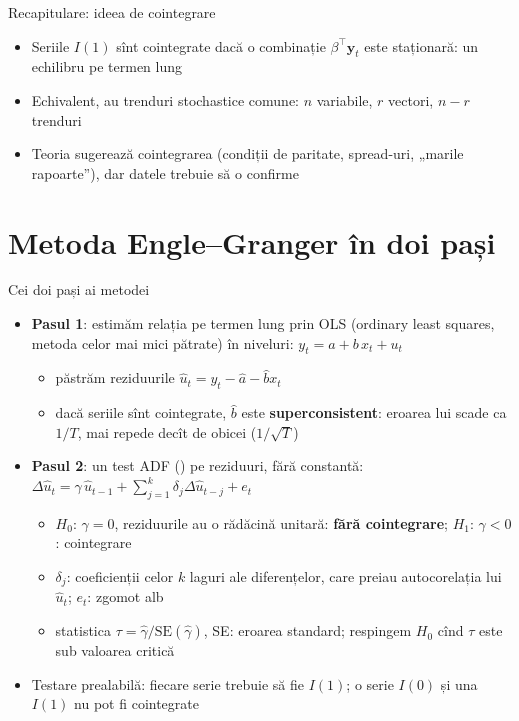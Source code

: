 \begin{frame}{Recapitulare: ideea de cointegrare}
\itemsize{\small}
\begin{itemize}
    \item Seriile $I(1)$ sînt cointegrate dacă o combinație $\beta^\top \mathbf y_t$ este staționară: un echilibru pe termen lung
    \item Echivalent, au trenduri stochastice comune: $n$ variabile, $r$ vectori, $n - r$ trenduri
    \item Teoria sugerează cointegrarea (condiții de paritate, spread-uri, „marile rapoarte”), dar datele trebuie să o confirme
\end{itemize}
\end{frame}


\section{Metoda Engle--Granger în doi pași}

\begin{frame}{Cei doi pași ai metodei}
\itemsize{\small}
\begin{itemize}
    \item \textbf{Pasul 1}: estimăm relația pe termen lung prin OLS (ordinary least squares, metoda celor mai mici pătrate) în niveluri: $y_t = a + b\,x_t + u_t$
    \begin{itemize}
        \item păstrăm reziduurile $\hat u_t = y_t - \hat a - \hat b x_t$
        \item dacă seriile sînt cointegrate, $\hat b$ este \textbf{superconsistent}: eroarea lui scade ca $1/T$, mai repede decît de obicei ($1/\sqrt{T}$)
    \end{itemize}
    \item \textbf{Pasul 2}: un test ADF () pe reziduuri, fără constantă: $\Delta\hat u_t = \gamma\,\hat u_{t-1} + \sum_{j=1}^{k}\delta_j\Delta\hat u_{t-j} + e_t$
    \begin{itemize}
        \item $H_0$: $\gamma = 0$, reziduurile au o rădăcină unitară: \textbf{fără cointegrare}; $H_1$: $\gamma < 0$: cointegrare
        \item $\delta_j$: coeficienții celor $k$ laguri ale diferențelor, care preiau autocorelația lui $\hat u_t$; $e_t$: zgomot alb
        \item statistica $\tau = \hat\gamma/\mathrm{SE}(\hat\gamma)$, SE: eroarea standard; respingem $H_0$ cînd $\tau$ este sub valoarea critică
    \end{itemize}
    \item Testare prealabilă: fiecare serie trebuie să fie $I(1)$; o serie $I(0)$ și una $I(1)$ nu pot fi cointegrate
\end{itemize}
\end{frame}

